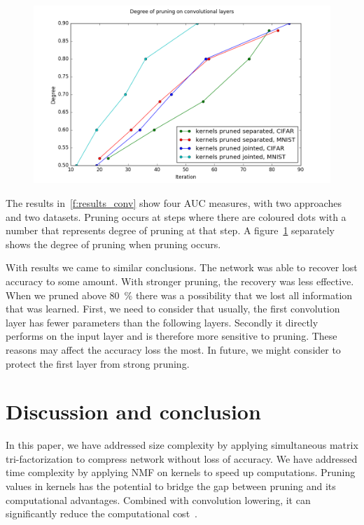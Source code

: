 \documentclass{article} %
\begin{document}
\begin{figure}[!ht]
\centering
\includegraphics[width=.8\linewidth]{convdegree.png}
\label{f:degree_conv}
\end{figure}

The results in~\ref{f:results_conv} show four AUC measures, with two approaches 
and two datasets. Pruning occurs at steps where there are coloured dots with a 
number that represents degree of pruning at that step. A 
figure~\ref{f:degree_conv}
separately shows the degree of pruning when pruning occurs.

With results we came to similar conclusions. The network was able to recover 
lost accuracy to some amount. With stronger pruning, the recovery was less 
effective. When we pruned above 80~\% there was a possibility that we lost all 
information that was learned. First, we need to consider that usually, the first 
convolution layer has fewer parameters than the following layers. Secondly it 
directly performs on the input layer and is therefore more sensitive to pruning. 
These reasons may affect the accuracy loss the most. In future, we might 
consider to protect the first layer from strong pruning.


\newpage 
\section{Discussion and conclusion}
In this paper, we have addressed size complexity by applying simultaneous 
matrix tri-factorization to compress network without loss of accuracy. We have 
addressed time complexity 
by applying NMF on kernels to speed up computations. Pruning values in kernels 
has the potential to bridge the gap between pruning and its computational 
advantages. Combined with convolution lowering, it can significantly reduce the 
computational cost~\cite{anwar2015structured}.
\end{document}
